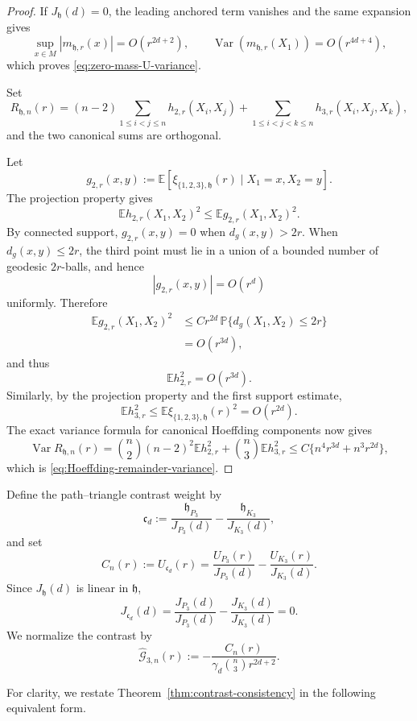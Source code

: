 \documentclass[11pt]{article}
\theoremstyle{remark}
\newcommand{\E}{\mathbb E}
\numberwithin{equation}{section}
\begin{document}
\begin{proof}
If $J_{\mathfrak h}(d)=0$, the leading anchored term vanishes and the
same expansion gives
\[
\sup_{x\in M}|m_{\mathfrak h,r}(x)|=O(r^{2d+2}),
\qquad
\operatorname{Var}(m_{\mathfrak h,r}(X_1))=O(r^{4d+4}),
\]
which proves \eqref{eq:zero-mass-U-variance}.


Set
\[
R_{\mathfrak h,n}(r)
=
(n-2)\sum_{1\le i<j\le n}h_{2,r}(X_i,X_j)
+\sum_{1\le i<j<k\le n}h_{3,r}(X_i,X_j,X_k),
\]
and the two canonical sums are orthogonal.

Let
\[
g_{2,r}(x,y)
:=
\E[\xi_{\{1,2,3\},\mathfrak h}(r)
\mid X_1=x,X_2=y].
\]
The projection property gives
\[
\E h_{2,r}(X_1,X_2)^2
\le
\E g_{2,r}(X_1,X_2)^2.
\]
By connected support, $g_{2,r}(x,y)=0$ when $d_g(x,y)>2r$.
When $d_g(x,y)\le2r$, the third point must lie in a union of a bounded
number of geodesic $2r$-balls, and hence
\[
|g_{2,r}(x,y)|=O(r^d)
\]
uniformly.  Therefore
\[
\begin{aligned}
\E g_{2,r}(X_1,X_2)^2
&\le
Cr^{2d}\,
\mathbb P\{d_g(X_1,X_2)\le2r\}\\
&=O(r^{3d}),
\end{aligned}
\]
and thus
\[
\E h_{2,r}^2=O(r^{3d}).
\]
Similarly, by the projection property and the first support estimate,
\[
\E h_{3,r}^2
\le
\E\xi_{\{1,2,3\},\mathfrak h}(r)^2
=
O(r^{2d}).
\]
The exact variance formula for canonical Hoeffding components now gives
\[
\operatorname{Var}R_{\mathfrak h,n}(r)
=
\binom n2(n-2)^2\E h_{2,r}^2
+\binom n3\E h_{3,r}^2
\le
C\{n^4r^{3d}+n^3r^{2d}\},
\]
which is \eqref{eq:Hoeffding-remainder-variance}.
\end{proof}

Define the path--triangle contrast weight by
\[
\mathfrak c_d
:=
\frac{\mathfrak h_{P_3}}{J_{P_3}(d)}
-
\frac{\mathfrak h_{K_3}}{J_{K_3}(d)},
\]
and set
\[
C_n(r)
:=
U_{\mathfrak c_d}(r)
=
\frac{U_{P_3}(r)}{J_{P_3}(d)}
-
\frac{U_{K_3}(r)}{J_{K_3}(d)}.
\]
Since $J_{\mathfrak h}(d)$ is linear in $\mathfrak h$,
\[
J_{\mathfrak c_d}(d)
=
\frac{J_{P_3}(d)}{J_{P_3}(d)}
-
\frac{J_{K_3}(d)}{J_{K_3}(d)}
=
0.
\]
We normalize the contrast by
\[
\widehat{\mathcal G}_{3,n}(r)
:=
-\frac{C_n(r)}
{\gamma_d\binom n3 r^{2d+2}}.
\]


For clarity, we restate Theorem~\ref{thm:contrast-consistency} in the
following equivalent form.
\end{document}
